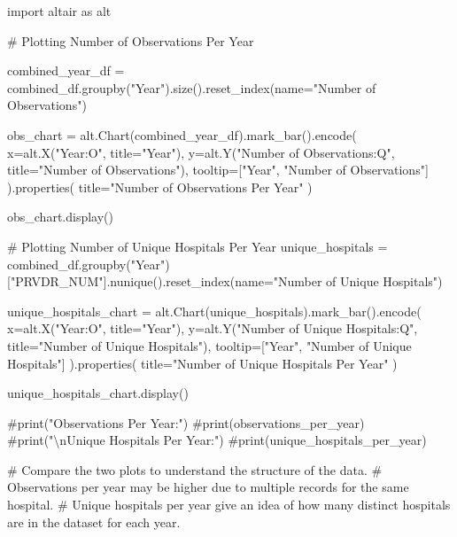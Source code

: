 \documentclass[
  letterpaper,
  DIV=11,
  numbers=noendperiod]{scrartcl}
\newenvironment{Shaded}{\begin{snugshade}}{\end{snugshade}}
\newcommand{\CommentTok}[1]{\textcolor[rgb]{0.37,0.37,0.37}{#1}}
\newcommand{\ImportTok}[1]{\textcolor[rgb]{0.00,0.46,0.62}{#1}}
\newcommand{\NormalTok}[1]{\textcolor[rgb]{0.00,0.23,0.31}{#1}}
\newcommand{\OperatorTok}[1]{\textcolor[rgb]{0.37,0.37,0.37}{#1}}
\newcommand{\StringTok}[1]{\textcolor[rgb]{0.13,0.47,0.30}{#1}}
\begin{document}
\begin{Shaded}
\begin{Highlighting}[]
\ImportTok{import}\NormalTok{ altair }\ImportTok{as}\NormalTok{ alt}

\CommentTok{\# Plotting Number of Observations Per Year}

\NormalTok{combined\_year\_df }\OperatorTok{=}\NormalTok{ combined\_df.groupby(}\StringTok{"Year"}\NormalTok{).size().reset\_index(name}\OperatorTok{=}\StringTok{"Number of Observations"}\NormalTok{)}

\NormalTok{obs\_chart }\OperatorTok{=}\NormalTok{ alt.Chart(combined\_year\_df).mark\_bar().encode(}
\NormalTok{    x}\OperatorTok{=}\NormalTok{alt.X(}\StringTok{"Year:O"}\NormalTok{, title}\OperatorTok{=}\StringTok{"Year"}\NormalTok{),  }
\NormalTok{    y}\OperatorTok{=}\NormalTok{alt.Y(}\StringTok{"Number of Observations:Q"}\NormalTok{, title}\OperatorTok{=}\StringTok{"Number of Observations"}\NormalTok{),}
\NormalTok{    tooltip}\OperatorTok{=}\NormalTok{[}\StringTok{"Year"}\NormalTok{, }\StringTok{"Number of Observations"}\NormalTok{]}
\NormalTok{).properties(}
\NormalTok{    title}\OperatorTok{=}\StringTok{"Number of Observations Per Year"}
\NormalTok{)}

\NormalTok{obs\_chart.display()}


\CommentTok{\# Plotting Number of Unique Hospitals Per Year}
\NormalTok{unique\_hospitals }\OperatorTok{=}\NormalTok{ combined\_df.groupby(}\StringTok{"Year"}\NormalTok{)[}\StringTok{"PRVDR\_NUM"}\NormalTok{].nunique().reset\_index(name}\OperatorTok{=}\StringTok{"Number of Unique Hospitals"}\NormalTok{)}

\NormalTok{unique\_hospitals\_chart }\OperatorTok{=}\NormalTok{ alt.Chart(unique\_hospitals).mark\_bar().encode(}
\NormalTok{    x}\OperatorTok{=}\NormalTok{alt.X(}\StringTok{"Year:O"}\NormalTok{, title}\OperatorTok{=}\StringTok{"Year"}\NormalTok{), }
\NormalTok{    y}\OperatorTok{=}\NormalTok{alt.Y(}\StringTok{"Number of Unique Hospitals:Q"}\NormalTok{, title}\OperatorTok{=}\StringTok{"Number of Unique Hospitals"}\NormalTok{),}
\NormalTok{    tooltip}\OperatorTok{=}\NormalTok{[}\StringTok{"Year"}\NormalTok{, }\StringTok{"Number of Unique Hospitals"}\NormalTok{]}
\NormalTok{).properties(}
\NormalTok{    title}\OperatorTok{=}\StringTok{"Number of Unique Hospitals Per Year"}
\NormalTok{)}

\NormalTok{unique\_hospitals\_chart.display()}


\CommentTok{\#print("Observations Per Year:")}
\CommentTok{\#print(observations\_per\_year)}
\CommentTok{\#print("\textbackslash{}nUnique Hospitals Per Year:")}
\CommentTok{\#print(unique\_hospitals\_per\_year)}

\CommentTok{\# Compare the two plots to understand the structure of the data.}
\CommentTok{\# Observations per year may be higher due to multiple records for the same hospital.}
\CommentTok{\# Unique hospitals per year give an idea of how many distinct hospitals are in the dataset for each year.}
\end{Highlighting}
\end{Shaded}
\end{document}
